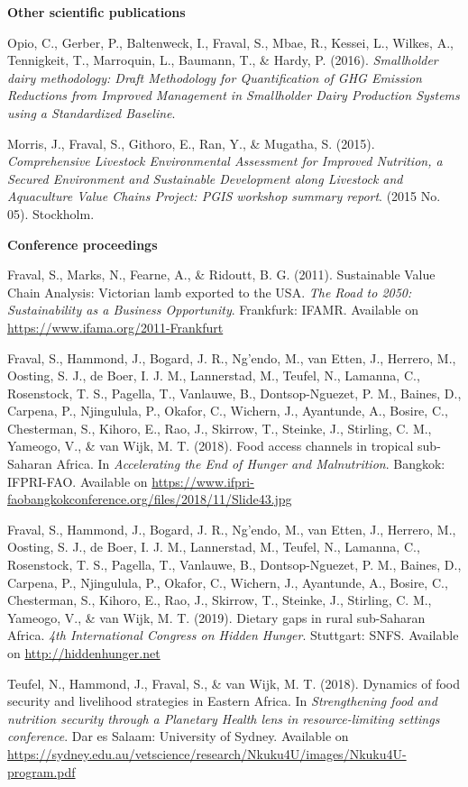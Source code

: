 {\normalsize\textbf{Other scientific publications}}

Opio, C., Gerber, P., Baltenweck, I., Fraval, S., Mbae, R., Kessei, L., Wilkes, A., Tennigkeit, T., Marroquin, L., Baumann, T., \& Hardy, P. (2016). \textit{Smallholder dairy methodology: Draft Methodology for Quantification of GHG Emission Reductions from Improved Management in Smallholder Dairy Production Systems using a Standardized Baseline}.

Morris, J., Fraval, S., Githoro, E., Ran, Y., \& Mugatha, S. (2015). \textit{Comprehensive Livestock Environmental Assessment for Improved Nutrition, a Secured Environment and Sustainable Development along Livestock and Aquaculture Value Chains Project: PGIS workshop summary report}. (2015 No. 05). Stockholm.

{\normalsize\textbf{Conference proceedings}}

Fraval, S., Marks, N., Fearne, A., \& Ridoutt, B. G. (2011). Sustainable Value Chain Analysis: Victorian  lamb exported  to  the USA. \textit{The Road to 2050: Sustainability as a Business Opportunity}. Frankfurk: IFAMR. Available on \url{https://www.ifama.org/2011-Frankfurt}

Fraval, S., Hammond, J., Bogard, J. R., Ng'endo, M., van Etten, J., Herrero, M., Oosting, S. J., de Boer, I. J. M., Lannerstad, M., Teufel, N., Lamanna, C., Rosenstock, T. S., Pagella, T., Vanlauwe, B., Dontsop-Nguezet, P. M., Baines, D., Carpena, P., Njingulula, P., Okafor, C., Wichern, J., Ayantunde, A., Bosire, C., Chesterman, S., Kihoro, E., Rao, J., Skirrow, T., Steinke, J., Stirling, C. M., Yameogo, V., \& van Wijk, M. T. (2018). Food access channels in tropical sub-Saharan Africa. In \textit{Accelerating the End of Hunger and Malnutrition}. Bangkok: IFPRI-FAO. Available on \url{https://www.ifpri-faobangkokconference.org/files/2018/11/Slide43.jpg}

Fraval, S., Hammond, J., Bogard, J. R., Ng'endo, M., van Etten, J., Herrero, M., Oosting, S. J., de Boer, I. J. M., Lannerstad, M., Teufel, N., Lamanna, C., Rosenstock, T. S., Pagella, T., Vanlauwe, B., Dontsop-Nguezet, P. M., Baines, D., Carpena, P., Njingulula, P., Okafor, C., Wichern, J., Ayantunde, A., Bosire, C., Chesterman, S., Kihoro, E., Rao, J., Skirrow, T., Steinke, J., Stirling, C. M., Yameogo, V., \& van Wijk, M. T. (2019). Dietary gaps in rural sub-Saharan Africa. \textit{4th International Congress on Hidden Hunger}. Stuttgart: SNFS. Available on \url{http://hiddenhunger.net}

Teufel, N., Hammond, J., Fraval, S., \& van Wijk, M. T. (2018). Dynamics of food security and livelihood strategies in Eastern Africa. In \textit{Strengthening food and nutrition security through a Planetary Health lens in resource-limiting settings conference}. Dar es Salaam: University of Sydney. Available on \url{https://sydney.edu.au/vetscience/research/Nkuku4U/images/Nkuku4U-program.pdf}
\normalsize
